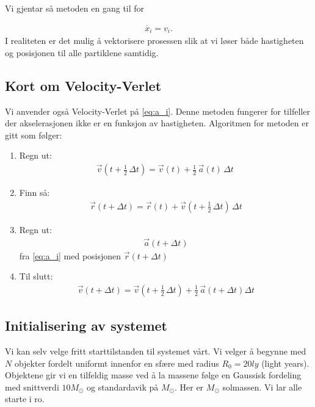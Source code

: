 \documentclass[11pt]{article}
\begin{document}
\begin{multicols}{2}
Vi gjentar så metoden en gang til for 

\begin{align*}
\dot{x_i} = v_i.
\end{align*}
I realiteten er det mulig å vektorisere prosessen slik at vi løser
både hastigheten og posisjonen til alle partiklene samtidig.

\subsection{Kort om Velocity-Verlet~\small{\cite{Velocity-Verlet}}}
\label{sec:om-VV}
Vi anvender også Velocity-Verlet på \eqref{eq:a_i}. Denne metoden fungerer for tilfeller der 
akselerasjonen ikke er en funksjon av hastigheten. 
Algoritmen for metoden er gitt som følger:

\begin{enumerate}
\item Regn ut: \begin{align*}
\vec{v}\left(t + \tfrac12\,\Delta t\right) = \vec{v}(t) + \tfrac12\,\vec{a}(t)\,\Delta t\ 
\end{align*}


\item Finn så: \begin{align*} \vec{r}(t + \Delta t) = \vec{r}(t) + \vec{v}\left(t + \tfrac12\,\Delta t\right)\, \Delta t \end{align*}


\item Regn ut: \begin{align*} \vec{a}(t + \Delta t) 
\end{align*} fra \eqref{eq:a_i} med posisjonen $ \vec{r}(t + \Delta t) $


\item Til slutt: \begin{align*} \vec{v}(t + \Delta t) = \vec{v}\left(t + \tfrac12\,\Delta t\right) + \tfrac12\,\vec{a}(t + \Delta t)\Delta t \end{align*}
\end{enumerate}

\subsection{Initialisering av systemet}
\label{sec:init-av-system}
Vi kan selv velge fritt starttilstanden til systemet vårt. Vi velger å
begynne med $N$ objekter fordelt uniformt innenfor en sfære med
radius $R_0=20 ly$ (light years). Objektene gir vi en tilfeldig masse ved å la massene
følge en Gaussisk fordeling med snittverdi $10M_\odot$ og standardavik
på $M_\odot$. Her er $M_\odot$ solmassen. Vi lar alle starte i ro. 


\end{multicols}
\end{document}
